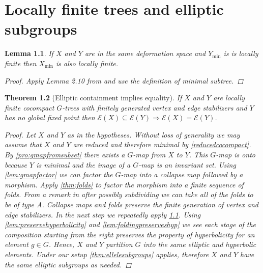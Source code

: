 \documentclass[12pt,parskip=full]{report}
\theoremstyle{plain}
\newtheorem{thm}{Theorem}[section]
\newtheorem{lem}[thm]{Lemma}
\theoremstyle{definition}
\begin{document}
\chapter{Locally finite trees and elliptic subgroups}

\begin{lem}
    \label{lem:pullbacklocallyfinite}
    If \(X\) and \(Y\) are in the same deformation space and \(Y_\text{min}\) is is locally finite then \(X_\text{min}\) is also locally finite.
    \begin{proof}
        Apply Lemma 2.10 from \cite{draftpaper} and use the definition of minimal subtree.
    \end{proof}
\end{lem}


\begin{thm}
    [Elliptic containment implies equality]
    \label{thm:ellipticimpliesequality} 
    If \(X\) and \(Y\) are locally finite cocompact \(G\)-trees with finitely generated vertex and edge stabilizers and \(Y\) has no global fixed point then \(\mathcal{E}(X) \subseteq \mathcal{E}(Y) \Longrightarrow \mathcal{E}(X) = \mathcal{E}(Y) \). 
\begin{proof}

    Let \(X\) and \(Y\) as in the hypotheses. Without loss of generality we may assume that \(X\) and \(Y\) are reduced and therefore minimal by \ref{reducedcocompact}. By \ref{pro:gmapfromsubset} there exists a \(G\)-map from \(X\) to \(Y\). This \(G\)-map is onto because \(Y\) is minimal and the image of a \(G\)-map is an invariant set. Using \ref{lem:gmapfactor} we can factor the \(G\)-map into a collapse map followed by a morphism. Apply \ref{thm:folds} to factor the morphism into a finite sequence of folds. From a remark in \cite{boundingcomplexity} after possibly subdividing we can take all of the folds to be of type A. Collapse maps and folds preserve the finite generation of vertex and edge stabilizers. In the next step we repeatedly apply \ref{lem:pullbacklocallyfinite}. Using \ref{lem:preservehyperbolicity} and \ref{lem:foldingpreserveshyp} we see each stage of the composition starting from the right preserves the property of hyperbolicity for an element \(g\in G\).  Hence, \(X\) and \(Y\) partition \(G\) into the same elliptic and hyperbolic elements. Under our setup \ref{thm:ellelesubgroups} applies, therefore \(X\) and \(Y\) have the same elliptic subgroups as needed.
\end{proof}
\end{thm}
\end{document}
